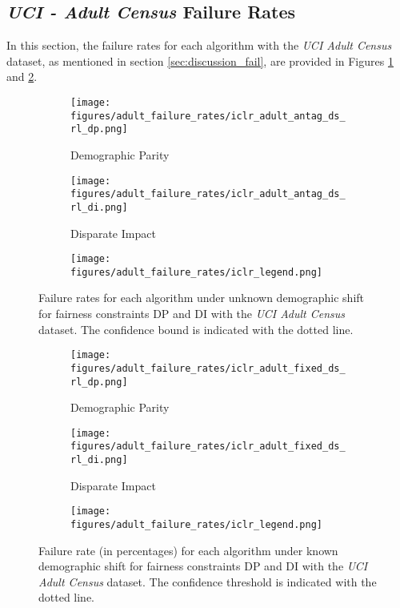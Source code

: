 \subsection{\textit{UCI - Adult Census} Failure Rates} \label{sec:failure_rates_appendix}
In this section, the failure rates for each algorithm with the \textit{UCI Adult Census} dataset, as mentioned in section \ref{sec:discussion_fail}, are provided in Figures \ref{fig:adult_fr_unk} and \ref{fig:adult_fr_k}.

\begin{figure}[!h]
    \begin{subfigure}{0.5\linewidth}
      \centering
      \texttt{[image: figures/adult\_failure\_rates/iclr\_adult\_antag\_ds\_rl\_dp.png]}
      \caption{Demographic Parity}
    \end{subfigure}
    \begin{subfigure}{0.5\linewidth}
      \centering
      \texttt{[image: figures/adult\_failure\_rates/iclr\_adult\_antag\_ds\_rl\_di.png]}
      \caption{Disparate Impact}
    \end{subfigure}
    \begin{subfigure}{\textwidth}
    \texttt{[image: figures/adult\_failure\_rates/iclr\_legend.png]}
    \end{subfigure}
    \caption{Failure rates for each algorithm under unknown demographic shift for fairness constraints DP and DI with the \textit{UCI Adult Census} dataset. The confidence bound is indicated with the dotted line.} 
    \label{fig:adult_fr_unk}
\end{figure}


\begin{figure}[ht]
    \begin{subfigure}{0.5\linewidth}
      \centering
      \texttt{[image: figures/adult\_failure\_rates/iclr\_adult\_fixed\_ds\_rl\_dp.png]}
      \caption{Demographic Parity}
    \end{subfigure}
    \begin{subfigure}{0.5\linewidth}
      \centering
      \texttt{[image: figures/adult\_failure\_rates/iclr\_adult\_fixed\_ds\_rl\_di.png]}
      \caption{Disparate Impact}
    \end{subfigure}
    \begin{subfigure}{\textwidth}
    \texttt{[image: figures/adult\_failure\_rates/iclr\_legend.png]}
    \end{subfigure}
    \caption{Failure rate (in percentages) for each algorithm under known demographic shift for fairness constraints DP and DI with the \textit{UCI Adult Census} dataset. The confidence threshold is indicated with the dotted line.} 
    \label{fig:adult_fr_k}
\end{figure}

